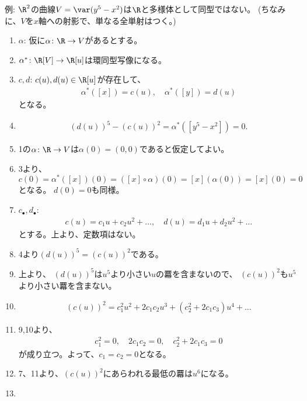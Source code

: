 \begin{framed}
  例:
  $\R^2$の曲線$V=\var(y^5-x^2)$は$\R$と多様体として同型ではない。
  (ちなみに、$V$を$x$軸への射影で、単なる全単射はつく。)
\end{framed}
\begin{myproof}
  \begin{enumerate}
    \item $\alpha$: 仮に$\alpha\colon \R \to V$があるとする。
    \item $\alpha^*\colon \R[V] \to \R[u]$は環同型写像になる。
    \item $c,d$: $c(u),d(u)\in \R[u]$が存在して、
    \begin{align}
      \alpha^*([x]) = c(u),\quad
      \alpha^*([y]) = d(u)
    \end{align}
    となる。
    \item
    \begin{align}
      (d(u))^5 - (c(u))^2 =
      \alpha^*([y^5-x^2]) = 0.
    \end{align}
    \item
    1の$\alpha\colon \R \to V$は$\alpha(0) = (0,0)$であると仮定してよい。
    \item
    3より、$c(0) = \alpha^*([x])(0) = ([x]\circ \alpha)(0) = [x](\alpha(0)) = [x](0) = 0$となる。
    $d(0) = 0$も同様。
    \item $c_\bullet,d_\bullet$:
    \begin{align}
      c(u) = c_1 u + c_2 u^2 + \dots ,\quad
      d(u) = d_1 u + d_2 u^2 + \dots
    \end{align}
    とする。上より、定数項はない。
    \item
    4より$(d(u))^5 = (c(u))^2$である。
    \item
    上より、
    $(d(u))^5$は$u^5$より小さい$u$の羃を含まないので、
    $(c(u))^2$も$u^5$より小さい羃を含まない。
    \item
    \begin{align}
      (c(u))^2
      =
      c_1^2 u^2 + 2c_1 c_2 u^3 + (c_2^2 + 2c_1 c_3)u^4 + \dots
    \end{align}
    \item
    9,10より、
    \begin{align}
      c_1^2 = 0,\quad 2c_1 c_2 = 0,\quad c_2^2 + 2c_1 c_3=0
    \end{align}
    が成り立つ。よって、$c_1=c_2=0$となる。
    \item
    7、11より、$(c(u))^2$にあらわれる最低の羃は$u^6$になる。
    \item

\end{enumerate}
\end{myproof}
